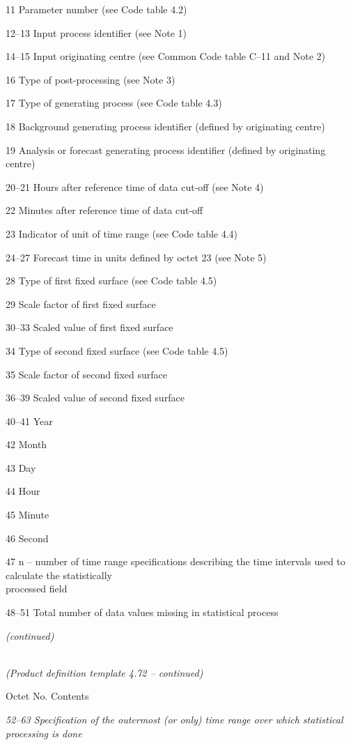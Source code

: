 11 Parameter number (see Code table 4.2)

12--13 Input process identifier (see Note 1)

14--15 Input originating centre (see Common Code table C--11 and Note 2)

16 Type of post-processing (see Note 3)

17 Type of generating process (see Code table 4.3)

18 Background generating process identifier (defined by originating centre)

19 Analysis or forecast generating process identifier (defined by originating centre)

20--21 Hours after reference time of data cut-off (see Note 4)

22 Minutes after reference time of data cut-off

23 Indicator of unit of time range (see Code table 4.4)

24--27 Forecast time in units defined by octet 23 (see Note 5)

28 Type of first fixed surface (see Code table 4.5)

29 Scale factor of first fixed surface

30--33 Scaled value of first fixed surface

34 Type of second fixed surface (see Code table 4.5)

35 Scale factor of second fixed surface

36--39 Scaled value of second fixed surface

40--41 Year

42 Month

43 Day

44 Hour

45 Minute

46 Second

47 n -- number of time range specifications describing the time intervals used to calculate the statistically\\
processed field

48--51 Total number of data values missing in statistical process

\emph{(continued)}

\emph{\\
(Product definition template 4.72 -- continued)}

Octet No. Contents

\emph{52--63 Specification of the outermost (or only) time range over which statistical}\\
\emph{processing is done}


